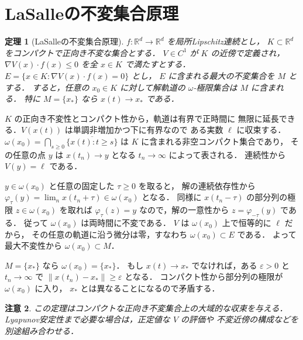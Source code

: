 \documentclass[a5paper,10pt,onecolumn]{jsarticle}
\makeatletter
\theoremstyle{mathnotetheorem}
\newtheorem{theorem}{定理}[section]
\newtheorem{remark}[theorem]{注意}
\renewcommand{\proofname}{証明}
\renewenvironment{proof}[1][\proofname]{%
  \par\pushQED{\qed}\normalfont\topsep4\p@\@plus2\p@\relax
  \trivlist\item[\hskip\labelsep\bfseries #1]\ignorespaces
}{\popQED\endtrivlist\@endpefalse}
\newcommand{\norm}[1]{\lVert #1\rVert}
\makeatother
\begin{document}
\section{LaSalleの不変集合原理}
\begin{theorem}[LaSalleの不変集合原理]
$f:\mathbb R^d\to\mathbb R^d$ を局所Lipschitz連続とし，
$K\subset\mathbb R^d$ をコンパクトで正向き不変な集合とする．
$V\in C^1$ が $K$ の近傍で定義され，
$\nabla V(x)\cdot f(x)\le0$ を全 $x\in K$ で満たすとする．
$E=\{x\in K:\nabla V(x)\cdot f(x)=0\}$ とし，
$E$ に含まれる最大の不変集合を $M$ とする．
すると，任意の $x_0\in K$ に対して解軌道の
$\omega$-極限集合は $M$ に含まれる．
特に $M=\{x_*\}$ なら $x(t)\to x_*$ である．
\end{theorem}
\begin{proof}
$K$ の正向き不変性とコンパクト性から，軌道は有界で正時間に
無限に延長できる．$V(x(t))$ は単調非増加かつ下に有界なので
ある実数 $\ell$ に収束する．
$\omega(x_0)=\bigcap_{s\ge0}\overline{\{x(t):t\ge s\}}$
は $K$ に含まれる非空コンパクト集合であり，
その任意の点 $y$ は $x(t_n)\to y$ となる $t_n\to\infty$ によって表される．
連続性から $V(y)=\ell$ である．

$y\in\omega(x_0)$ と任意の固定した $\tau\ge0$ を取ると，
解の連続依存性から
$\varphi_\tau(y)=\lim_n x(t_n+\tau)\in\omega(x_0)$ となる．
同様に $x(t_n-\tau)$ の部分列の極限 $z\in\omega(x_0)$ を取れば
$\varphi_\tau(z)=y$ なので，解の一意性から $z=\varphi_{-\tau}(y)$ である．
従って $\omega(x_0)$ は両時間に不変である．
$V$ は $\omega(x_0)$ 上で恒等的に $\ell$ だから，
その任意の軌道に沿う微分は零，すなわち
$\omega(x_0)\subset E$ である．
よって最大不変性から $\omega(x_0)\subset M$．

$M=\{x_*\}$ なら $\omega(x_0)=\{x_*\}$．
もし $x(t)\to x_*$ でなければ，ある $\varepsilon>0$ と
$t_n\to\infty$ で $\norm{x(t_n)-x_*}\ge\varepsilon$ となる．
コンパクト性から部分列の極限が $\omega(x_0)$ に入り，
$x_*$ とは異なることになるので矛盾する．
\end{proof}
\begin{remark}
この定理はコンパクトな正向き不変集合上の大域的な収束を与える．
Lyapunov安定性まで必要な場合は，正定値な $V$ の評価や
不変近傍の構成などを別途組み合わせる．
\end{remark}
\end{document}

